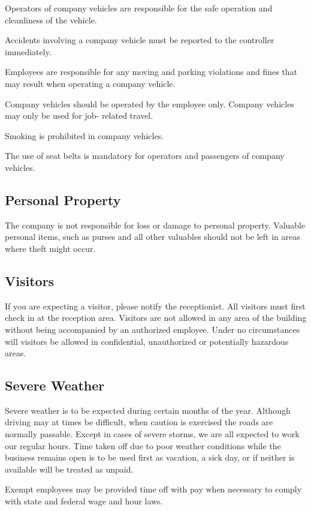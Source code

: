\documentclass{book}
\begin{document}
Operators of company vehicles are responsible for the safe operation and cleanliness of the vehicle.

Accidents involving a company vehicle must be reported to the controller immediately.

Employees are responsible for any moving and parking violations and fines that may result when operating a company vehicle.

Company vehicles should be operated by the employee only. Company vehicles may only be used for job- related travel.

Smoking is prohibited in company vehicles.

The use of seat belts is mandatory for operators and passengers of company vehicles.

\subsection{Personal Property}

The company is not responsible for loss or damage to personal property. Valuable personal items, such as purses and all other valuables should not be left in areas where theft might occur.

\subsection{Visitors}

If you are expecting a visitor, please notify the receptionist. All visitors must first check in at the reception area. Visitors are not allowed in any area of the building without being accompanied by an authorized employee. Under no circumstances will visitors be allowed in confidential, unauthorized or potentially hazardous areas.

\subsection{Severe Weather}

Severe weather is to be expected during certain months of the year. Although driving may at times be difficult, when caution is exercised the roads are normally passable. Except in cases of severe storms, we are all expected to work our regular hours. Time taken off due to poor weather conditions while the business remains open is to be used first as vacation, a sick day, or if neither is available will be treated as unpaid.

Exempt employees may be provided time off with pay when necessary to comply with state and federal wage and hour laws.
\end{document}
